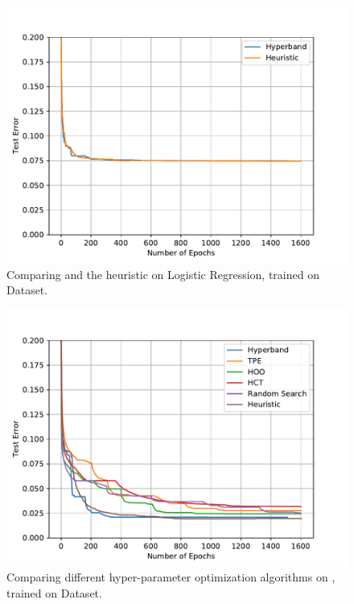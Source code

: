 \documentclass[twoside,11pt]{article}
\begin{document}
\begin{figure}[ht]
    \centering
    \includegraphics[scale=0.8]{img/mnist/logistic_1_bis.pdf}
    \caption{Comparing \Hyperband and the heuristic on Logistic Regression, trained on \MNIST Dataset.}
    \label{logistic_1_bis}
\end{figure}

\begin{figure}[ht]
    \centering
    \includegraphics[scale=0.8]{img/mnist/mlp_0_bis.pdf}
    \caption{Comparing different hyper-parameter optimization algorithms on \MLP, trained on \MNIST Dataset.}
    \label{mlp_0}
\end{figure}
\end{document}
